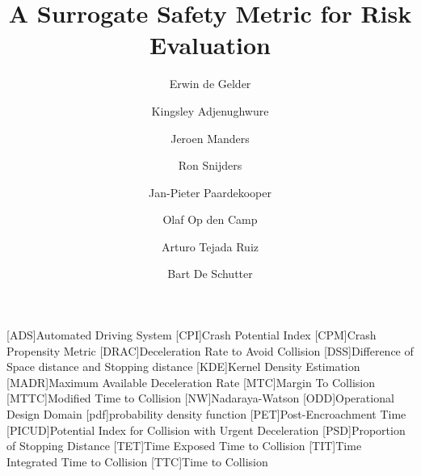 \documentclass[3p,onecolumn,authoryear]{elsarticle}
\title{A Surrogate Safety Metric for Risk Evaluation}
\author[1,2]{Erwin de Gelder\corref{cor1}}
\author[3]{Kingsley Adjenughwure}
\author[1]{Jeroen Manders}
\author[4]{Ron Snijders}
\author[1,5]{Jan-Pieter Paardekooper}
\author[1]{Olaf Op den Camp}
\author[1]{Arturo Tejada Ruiz}
\author[1,2]{Bart De Schutter}
\date{}
\begin{document}
\begin{acronym}[AAAAAAAA]
	[ADS]{Automated Driving System}
	[CPI]{Crash Potential Index}
	[CPM]{Crash Propensity Metric}
	[DRAC]{Deceleration Rate to Avoid Collision}
	[DSS]{Difference of Space distance and Stopping distance}
	[KDE]{Kernel Density Estimation}
	[MADR]{Maximum Available Deceleration Rate}
	[MTC]{Margin To Collision}
	[MTTC]{Modified Time to Collision}
	[NW]{Nadaraya-Watson}
	[ODD]{Operational Design Domain}
	[pdf]{probability density function}
	[PET]{Post-Encroachment Time}
	[PICUD]{Potential Index for Collision with Urgent Deceleration}
	[PSD]{Proportion of Stopping Distance}
	[TET]{Time Exposed Time to Collision}
	[TIT]{Time Integrated Time to Collision}
	[TTC]{Time to Collision}
\end{acronym}



\maketitle











\end{document}
